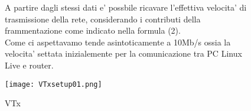 \documentclass[../lab2.tex]{subfiles}
\begin{document}
    \begin{figure}[!htb]
        \begin{minipage}{0.35\textwidth}
            A partire dagli stessi dati e' possbile ricavare l'effettiva velocita' di 
            trasmissione della rete, considerando i contributi della frammentazione
            come indicato nella formula (2). \\
            Come ci aspettavamo tende asintoticamente 
            a 10Mb/s ossia la velocita' settata inizialemente per la comunicazione tra
            PC Linux Live e router.
        
        \end{minipage}\hfill
        \begin{minipage}{0.6\textwidth}
            \centering
            \texttt{[image: VTxsetup01.png]}
            \vspace{-20pt}
            \caption{VTx}\label{VTxsetup01}
        \end{minipage}
    \end{figure}
\end{document}
